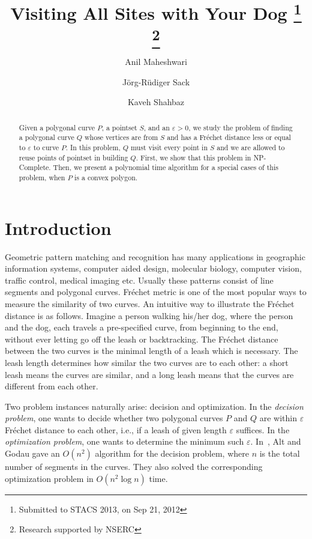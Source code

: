 \documentclass[a4paper,UKenglish]{lipics}
\title{Visiting All Sites with Your Dog 
\footnote{Submitted to STACS 2013, on Sep 21, 2012}
\footnote{Research supported by NSERC}}
\author[1]{Anil Maheshwari}
\author[2]{J\"{o}rg-R\"{u}diger Sack }
\author[3]{Kaveh Shahbaz}
\affil[1,2,3]{~School of Computer Scince \\ Carleton University 
\\ Ottawa, Ontario, Canada \\
Email: {\tt \{anil,sack,kshahbaz\}@scs.carleton.ca}}
\newcommand{\eps}{\varepsilon}
\newcommand{\Frechet}{Fr\'echet }
\newcommand{\pset}{S}
\begin{document}
\maketitle

\begin{abstract}
Given a polygonal curve $P$, a pointset $\pset$,
and an $\eps > 0$,
we study the problem of finding a polygonal curve $Q$
whose vertices are from $\pset$ and 
has a \Frechet distance less or equal to $\eps$ to curve $P$.
In this problem, $Q$ must visit every point in $\pset$
and we are allowed to reuse points of pointset in building $Q$.
First, we show that this problem in NP-Complete. 
Then, we present a polynomial time algorithm for 
a special cases of this problem, when 
$P$ is a convex polygon.
\end{abstract}











\section {Introduction}

Geometric pattern matching and recognition has many applications in 
geographic information systems, computer aided design,
molecular biology, computer vision, traffic control, medical imaging etc.
Usually these patterns consist of line segments and polygonal curves. 
\Frechet metric is one of the most popular ways to measure the similarity of two curves. 
An intuitive way to illustrate the \Frechet distance is as follows.
Imagine a person walking his/her dog, where the person and the dog, 
each travels a pre-specified curve, from beginning to the end, 
without ever letting go off the leash or backtracking.
The \Frechet distance between the two curves is the minimal length of a leash which is necessary.
The leash length determines how similar the two curves are to each other:
a short leash means the curves are similar,
and a long leash means that the curves are different from each other.

Two problem instances naturally arise:  decision and optimization.
In the {\em decision problem}, one wants to decide whether two polygonal curves $P$  and $Q$
are within $\eps$ \Frechet distance to each other, i.e., if a leash of given length $\eps$ suffices.
In the {\em optimization problem}, one wants to determine the minimum such $\eps$.
In~\cite{AltG95}, Alt and Godau gave an $O(n^2)$ algorithm for the decision problem,
where $n$ is the total number of segments in the curves.
They also solved the corresponding optimization problem in $O(n^2\log n)$ time.
\end{document}
